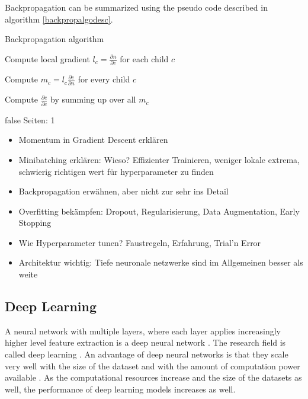 \documentclass[draft,final,oneside]{vutinfth} %
\begin{document}
Backpropagation can be summarized using the pseudo code described in algorithm \ref{backpropalgodesc}.

\begin{algorithm}
\caption{Backpropagation algorithm \cite{dlvc}}
\label{backpropalgodesc}

 {

Compute local gradient $l_c = \frac{\partial n}{\partial c}$ for each child $c$

Compute $m_c = l_c  \frac{\partial e}{\partial n}$ for every child $c$

Compute $\frac{\partial e}{\partial c}$ by summing up over all $m_c$

}
\end{algorithm}

\if false
Seiten: 1
\begin{itemize}

\item Momentum in Gradient Descent erklären
\item Minibatching erklären: Wieso? Effizienter Trainieren, weniger lokale extrema, schwierig richtigen wert für hyperparameter zu finden
\item Backpropagation erwähnen, aber nicht zur sehr ins Detail
\item Overfitting bekämpfen: Dropout, Regularisierung, Data Augmentation, Early Stopping
\item Wie Hyperparameter tunen? Faustregeln, Erfahrung, Trial'n Error
\item Architektur wichtig: Tiefe neuronale netzwerke sind im Allgemeinen besser als weite

\end{itemize}
\fi
\pagebreak
\subsection{Deep Learning} \label{dlbackground}

A neural network with multiple layers, where each layer applies increasingly higher level feature extraction is a deep neural network \cite{deeplearninginneuralnetworks}. The research field is called deep learning \cite{deeplearninginneuralnetworks}. An advantage of deep neural networks is that they scale very well with the size of the dataset and with the amount of computation power available \cite{alexnet}. As the computational resources increase and the size of the datasets as well, the performance of deep learning models increases as well.
\end{document}
